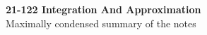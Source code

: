 \documentclass[10pt,twocolumn]{article}
\begin{document}
\thispagestyle{plain}
\begin{center}
{\LARGE\bfseries 21-122 Integration And Approximation}\\[-0.15em]
{\small Maximally condensed summary of the notes}
\end{center}
\end{document}
